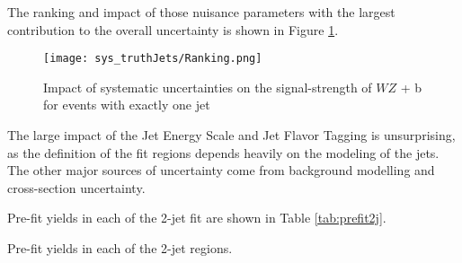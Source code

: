 The ranking and impact of those nuisance parameters with the largest contribution to the overall uncertainty is shown in Figure \ref{fig:ranking_1j}.

\begin{figure}[H]
    \centering
    \texttt{[image: sys\_truthJets/Ranking.png]}
    \caption{Impact of systematic uncertainties on the signal-strength of $WZ$ + b for events with exactly one jet}
    \label{fig:ranking_1j}
\end{figure}

The large impact of the Jet Energy Scale and Jet Flavor Tagging is unsurprising, as the definition of the fit regions depends heavily on the modeling of the jets. The other major sources of uncertainty come from background modelling and cross-section uncertainty. %




Pre-fit yields in each of the 2-jet fit are shown in Table \ref{tab:prefit2j}.

\begin{table}[H]
\begin{adjustwidth}{-3em}{-3em}
\small

\label{tab:prefit2j}
\caption{Pre-fit yields in each of the 2-jet regions.}                                     
\end{adjustwidth}
\end{table}

